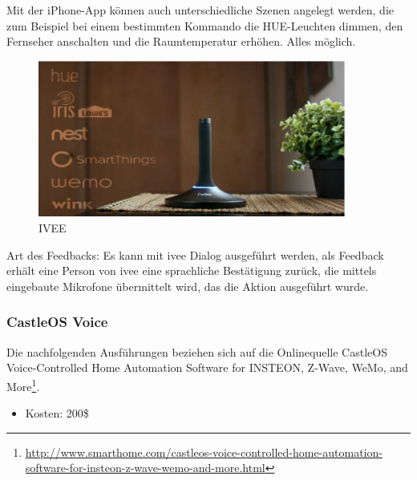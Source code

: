 Mit der iPhone-App können auch unterschiedliche Szenen angelegt werden, die zum Beispiel bei einem bestimmten Kommando die HUE-Leuchten dimmen, den Fernseher anschalten und die Raumtemperatur erhöhen. Alles möglich.

\begin{figure}[h!]
	\centering
	\includegraphics[width=0.9\textwidth]{img/Feedback-Mechanismen/IVEE.png}
	\caption{IVEE}
	\label{fig:feedbackIVEE}
\end{figure}

Art des Feedbacks: Es kann mit ivee Dialog ausgeführt werden, als Feedback erhält eine Person von ivee eine sprachliche Bestätigung zurück, die mittels eingebaute Mikrofone übermittelt wird, das die Aktion ausgeführt wurde.

\subsubsection{CastleOS Voice}
Die nachfolgenden Ausführungen beziehen sich auf die Onlinequelle \glqq CastleOS Voice-Controlled Home Automation Software for INSTEON, Z-Wave, WeMo, and More\grqq\footnote{\url{http://www.smarthome.com/castleos-voice-controlled-home-automation-software-for-insteon-z-wave-wemo-and-more.html}}.

\begin{itemize}
\item Kosten: 200\$
\end{itemize}

